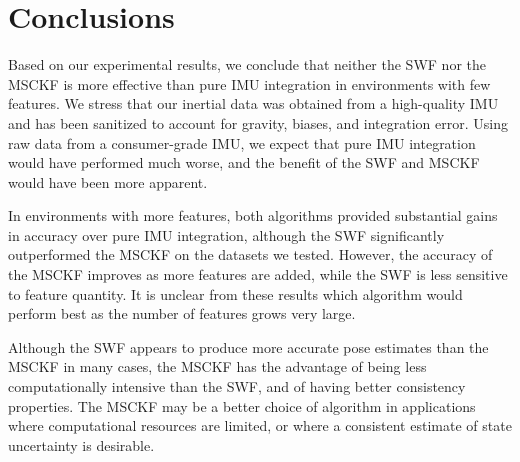 \documentclass[letterpaper, 10 pt, conference]{ieeeconf}  %
\begin{document}
\section{Conclusions} \label{sec:conclusions}
Based on our experimental results, we conclude that neither the SWF nor the MSCKF is more effective than pure IMU integration in environments with few features.
We stress that our inertial data was obtained from a high-quality IMU and has been sanitized to account for gravity, biases, and integration error.
Using raw data from a consumer-grade IMU, we expect that pure IMU integration would have performed much worse, and the benefit of the SWF and MSCKF would have been more apparent.

In environments with more features, both algorithms provided substantial gains in accuracy over pure IMU integration, although the SWF significantly outperformed the MSCKF on the datasets we tested.
However, the accuracy of the MSCKF improves as more features are added, while the SWF is less sensitive to feature quantity.
It is unclear from these results which algorithm would perform best as the number of features grows very large.

Although the SWF appears to produce more accurate pose estimates than the MSCKF in many cases, the MSCKF has the advantage of being less computationally intensive than the SWF, and of having better consistency properties.
The MSCKF may be a better choice of algorithm in applications where computational resources are limited, or where a consistent estimate of state uncertainty is desirable.


\def\url#1{} %


\end{document}
